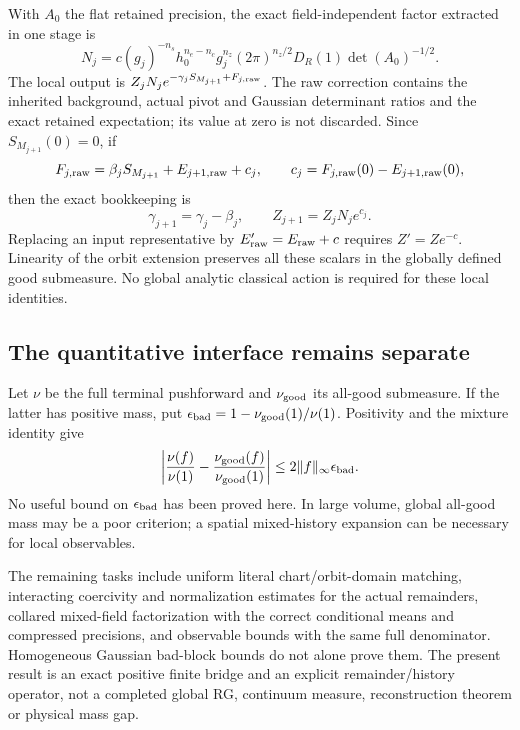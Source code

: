 \documentclass[11pt]{article}
\theoremstyle{remark}
\begin{document}
With \(A_0\) the flat retained precision, the exact field-independent
factor extracted in one stage is
\begin{equation}
 N_j=c(g_j)^{-n_s}h_0^{n_e-n_c}g_j^{n_z}(2\pi)^{n_z/2}
                       D_R(1)\det(A_0)^{-1/2}.
 \label{fps-vacuum-factor}
\end{equation}
The local output is
\(Z_jN_j e^{-\gamma_jS_{M_{j+1}}+F_{j,\rm raw}}\).
The raw correction contains the inherited background, actual pivot and
Gaussian determinant ratios and the exact retained expectation; its
value at zero is not discarded. Since \(S_{M_{j+1}}(0)=0\), if
\[
 F_{j,\rm raw}=\beta_jS_{M_{j+1}}+E_{j+1,\rm raw}+c_j,
 \qquad c_j=F_{j,\rm raw}(0)-E_{j+1,\rm raw}(0),
\]
then the exact bookkeeping is
\begin{equation}
 \gamma_{j+1}=\gamma_j-\beta_j,\qquad
 Z_{j+1}=Z_jN_j e^{c_j}.
 \label{fps-exact-extraction}
\end{equation}
Replacing an input representative by \(E'_{\rm raw}=E_{\rm raw}+c\)
requires \(Z'=Ze^{-c}\). Linearity of the orbit extension preserves
all these scalars in the globally defined good submeasure. No global
analytic classical action is required for these local identities.

\subsection{The quantitative interface remains separate}
\label{fps-boundary-section}

Let \(\nu\) be the full terminal pushforward and \(\nu_{\rm good}\)
its all-good submeasure. If the latter has positive mass, put
\(\epsilon_{\rm bad}=1-\nu_{\rm good}(1)/\nu(1)\).
Positivity and the mixture identity give
\begin{equation}
 \left|\frac{\nu(f)}{\nu(1)}-
             \frac{\nu_{\rm good}(f)}{\nu_{\rm good}(1)}\right|
 \le2\|f\|_\infty\epsilon_{\rm bad}.
 \label{fps-mixture-bound}
\end{equation}
No useful bound on \(\epsilon_{\rm bad}\) has been proved here. In large
volume, global all-good mass may be a poor criterion; a spatial
mixed-history expansion can be necessary for local observables.

The remaining tasks include uniform literal chart/orbit-domain matching,
interacting coercivity and normalization estimates for the actual
remainders, collared mixed-field factorization with the correct
conditional means and compressed precisions, and observable bounds with
the same full denominator. Homogeneous Gaussian bad-block bounds do not
alone prove them. The present result is an exact positive finite bridge
and an explicit remainder/history operator, not a completed global RG,
continuum measure, reconstruction theorem or physical mass gap.
\end{document}
